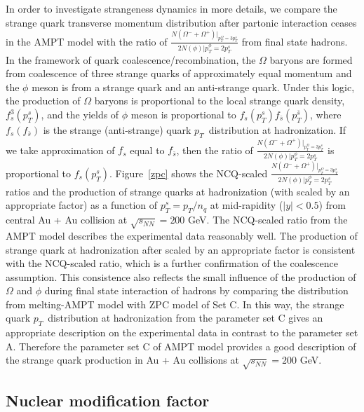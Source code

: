\documentclass[twocolumn,aps,prc,showpacs,superscriptaddress,preprintnumbers,floatfix,nofootinbib]{revtex4}
\newcommand{ \pt } {${p_{T}}$}
\begin{document}
\begin{CJK*}{GBK}{song}
In order to investigate strangeness dynamics in more details, we compare the strange quark transverse momentum distribution after partonic interaction ceases in the AMPT model with the ratio of $\frac{N(\Omega^{-}+\Omega^{+})|_{p_{T}^{\Omega} = 3p_{T}^{s}}}{2N(\phi)|p_{T}^{\phi} = 2p_{T}^{s}}$ from final state hadrons. In the framework of quark coalescence/recombination, the $\Omega$ baryons are formed from coalescence of three strange quarks of approximately equal momentum and the $\phi$ meson is from a strange quark and an anti-strange quark. Under this logic, the production of $\Omega$ baryons is proportional to the local strange quark density, $f_{s}^{3}(p_{T}^{s})$, and the yields of $\phi$ meson is proportional to $f_{s}(p_{T}^{s})f_{\bar{s}}(p_{T}^{\bar{s}})$, where $f_{s}(f_{\bar{s}})$ is the strange (anti-strange) quark \pt~distribution at hadronization. If we take approximation of $f_{s}$ equal to $f_{\bar{s}}$, then the ratio of $\frac{N(\Omega^{-}+\Omega^{+})|_{p_{T}^{\Omega} = 3p_{T}^{s}}}{2N(\phi)|p_{T}^{\phi} = 2p_{T}^{s}}$ is proportional to $f_{s}(p_{T}^{s})$. Figure~\ref{zpc} shows the NCQ-scaled $\frac{N(\Omega^{-}+\Omega^{+})|_{p_{T}^{\Omega} = 3p_{T}^{s}}}{2N(\phi)|p_{T}^{\phi} = 2p_{T}^{s}}$ ratios and the production of strange quarks at hadronization (with scaled by an appropriate factor) as a function of $p_{T}^{s} = p_{T}/n_{q}$ at mid-rapidity ($|y|<0.5$) from central Au + Au collision at $\sqrt{s_{NN}} = 200$ GeV. The NCQ-scaled ratio from the AMPT model describes the experimental data reasonably well. The production of strange quark at hadronization after scaled by an appropriate factor is consistent with the NCQ-scaled ratio, which is a further confirmation of the coalescence assumption. This consistence also reflects the small influence of the production of $\Omega$ and $\phi$ during final state interaction of hadrons by comparing the distribution from melting-AMPT model with ZPC model of Set C. In this way, the strange quark \pt~distribution at hadronization from the parameter set C gives an appropriate description on the experimental data in contrast to the parameter set A. Therefore the parameter set C of AMPT model provides a good description of the strange quark production in Au + Au collisions at $\sqrt{s_{NN}} = 200$ GeV.

\subsection{Nuclear modification factor}


\end{CJK*}
\end{document}
